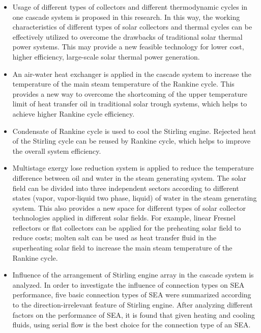 \begin{itemize}
  \item Usage of different types of collectors and different thermodynamic cycles in one cascade system is proposed in this research. In this way, the working characteristics of different types of solar collectors and thermal cycles can be effectively utilized to overcome the drawbacks of traditional solar thermal power systems. This may provide a new feasible technology for lower cost, higher efficiency, large-scale solar thermal power generation.
  \item An air-water heat exchanger is applied in the cascade system to increase the temperature of the main steam temperature of the Rankine cycle. This provides a new way to overcome the shortcoming of the upper temperature limit of heat transfer oil in traditional solar trough systems, which helps to achieve higher Rankine cycle efficiency.
  \item Condensate of Rankine cycle is used to cool the Stirling engine. Rejected heat of the Stirling cycle can be reused by Rankine cycle, which helps to improve the overall system efficiency. 
  \item Multistage exergy lose reduction system is applied to reduce the temperature difference between oil and water in the steam generating system. The solar field can be divided into three independent sectors according to different states (vapor, vapor-liquid two phase, liquid) of water in the steam generating system. This also provides a new space for different types of solar collector technologies applied in different solar fields. For example, linear Fresnel reflectors or flat collectors can be applied for the preheating solar field to reduce costs; molten salt can be used as heat transfer fluid in the superheating solar field to increase the main steam temperature of the Rankine cycle.
  \item Influence of the arrangement of Stirling engine array in the cascade system is analyzed. In order to investigate the influence of connection types on SEA performance, five basic connection types of SEA were summarized according to the direction-irrelevant feature of Stirling engine. After
analyzing different factors on the performance of SEA, it is found that given heating and cooling fluids, using serial flow is the best choice for the connection type of an SEA.
\end{itemize}

\newpage
